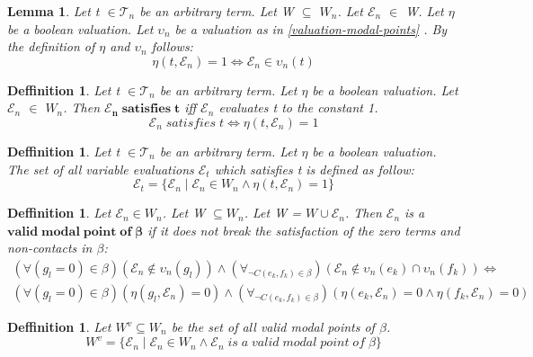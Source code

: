 \documentclass{article}
\newcommand\E{\mathcal{E}}
\newcommand\Tn{\mathcal{T}_n}
\newtheorem{lemma}[theorem]{Lemma}
\newtheorem{defn}[theorem]{Deffinition}
\begin{document}
		\begin{lemma}
			Let t $\in \Tn$ be an arbitrary term. Let W $\subseteq$ $W_n$. Let $\E_n$ $\in$ W. Let $\eta$ be a boolean valuation. Let $\upsilon_n$ be a valuation as in \ref{valuation-modal-points} . By the definition of $\eta$ and $\upsilon_n$ follows:
			\begin{equation}
				\eta(t, \E_n) = 1 \iff \E_n \in \upsilon_n(t)
			\end{equation}
		\end{lemma}

		\begin{defn}
			Let t $\in \Tn$ be an arbitrary term. Let $\eta$ be a boolean valuation. Let $\E_n$ $\in$ $W_n$. Then $\mathbf{\E_n \; satisfies \; t}$ iff $\E_n$ evaluates t to the constant 1.
			\begin{equation}
				\E_n \; satisfies \; t \iff \eta(t, \E_n) = 1
			\end{equation}
		\end{defn}

		\begin{defn}
			Let t $\in \Tn$ be an arbitrary term. Let $\eta$ be a boolean valuation. The set of all variable evaluations $\E_t$ which satisfies t is defined as follow:
			\begin{equation}
				\E_t = \{ \E_n \mid \E_n \in W_n \land \eta(t, \E_n) = 1 \}
			\end{equation}
		\end{defn}

		\begin{defn}
			Let $\E_n \in W_n$. Let W $\subseteq W_n$. Let W = $W \cup {\E_n}$. Then $\E_n$ is a $\mathbf{valid \; modal \; point \; of \; \beta}$ if it does not break the satisfaction of the zero terms and non-contacts in $\beta$:
			\begin{align*}
				(\forall (g_l = 0) \in \beta)(\E_n \notin \upsilon_n(g_l)) \land
				(\forall_{\neg C(e_k, f_k) \in \beta})(\E_n \notin \upsilon_n(e_k) \cap \upsilon_n(f_k)) \iff \\
				(\forall (g_l = 0) \in \beta)(\eta(g_l, \E_n) = 0) \land
				(\forall_{\neg C(e_k, f_k) \in \beta})(\eta(e_k, \E_n) = 0 \land \eta(f_k, \E_n) = 0)
			\end{align*}
		\end{defn}

		\begin{defn}\label{set-all-valid-modal-points}
			Let $W^v \subseteq W_n$ be the set of all valid modal points of $\beta$.
			\begin{equation}
				W^v = \{ \E_n \mid \E_n \in W_n \land \E_n \; is \; a \; valid \; modal \; point \; of \; \beta \}
			\end{equation}
		\end{defn}
\end{document}
